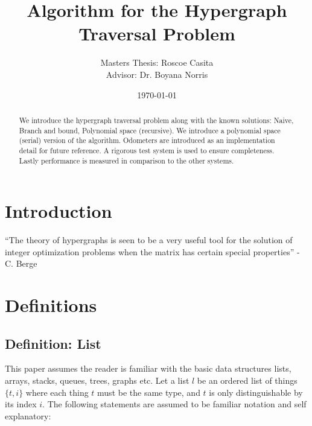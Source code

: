 \documentclass[10pt]{article}
\title{Algorithm for the Hypergraph Traversal Problem }
\author{
	Masters Thesis: Roscoe Casita \\
	Advisor: Dr. Boyana Norris\\
}
\date{\today}
\begin{document}
	\maketitle
	\begin{abstract}
		We introduce the hypergraph traversal problem along with the known solutions: Naive, Branch and bound, Polynomial space (recursive). We introduce a polynomial space (serial) version of the algorithm. Odometers are introduced as an implementation detail for future reference. A rigorous test system is used to ensure completeness. Lastly performance is measured in comparison to the other systems. 
	\end{abstract}
	\tableofcontents

\newpage
\section{Introduction}

``The theory of hypergraphs is seen to be a very useful tool for the solution of integer optimization problems when the matrix has certain special properties'' - C. Berge \cite{Hypergraph:Book}



\newpage
\section{Definitions}

\subsection{Definition: List}
This paper assumes the reader is familiar with the basic data structures lists, arrays, stacks, queues, trees, graphs etc. Let a list $l$ be an ordered list of things $\{t,i\}$ where each thing $t$ must be the same type, and $t$ is only distinguishable by its index $i$. The following statements are assumed to be familiar notation and self explanatory:
\end{document}
